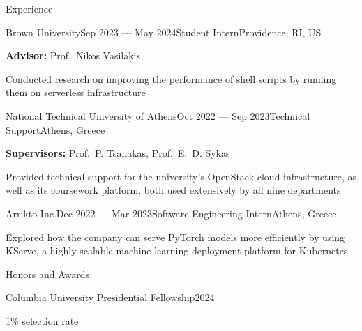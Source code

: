 \documentclass[letterpaper, 12pt]{resume}
\begin{document}
\begin{rSection}{Experience}
    \begin{rSubsection}{Brown University}{Sep 2023 --- May 2024}{Student Intern}{Providence, RI, US}
        \item \textbf{Advisor:} Prof.\ Nikos Vasilakis
        \item Conducted research on improving the performance of shell scripts by running them on serverless infrastructure
    \end{rSubsection}

    \begin{rSubsection}{National Technical University of Athens}{Oct 2022 --- Sep 2023}{Technical Support}{Athens, Greece}
        \item \textbf{Supervisors:} Prof.\ P. Tsanakas, Prof.\ E.\ D. Sykas
        \item Provided technical support for the university's OpenStack cloud infrastructure, as well as its coursework platform, both used extensively by all nine departments
    \end{rSubsection}

    \begin{rSubsection}{Arrikto Inc.}{Dec 2022 --- Mar 2023}{Software Engineering Intern}{Athens, Greece}
        \item Explored how the company can serve PyTorch models more efficiently by using KServe, a highly scalable machine learning deployment platform for Kubernetes
    \end{rSubsection}

\end{rSection}

\begin{rSection}{Honors and Awards}
    \begin{rSubsection}{Columbia University Presidential Fellowship}{2024}{}{}
        \item 1\% selection rate
    \end{rSubsection}
\end{rSection}
\end{document}
